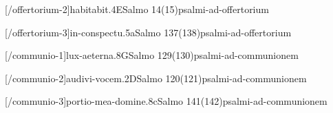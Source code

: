 \AllowPageFlush

[\Prefix/offertorium-2]{habitabit.4E}{Salmo 14(15)}{psalmi-ad-offertorium}

\AllowPageFlush

[\Prefix/offertorium-3]{in-conspectu.5a}{Salmo 137(138)}{psalmi-ad-offertorium}

\AllowPageBreak

[\Prefix/communio-1]{lux-aeterna.8G}{Salmo 129(130)}{psalmi-ad-communionem}

\AllowPageFlush

[\Prefix/communio-2]{audivi-vocem.2D}{Salmo 120(121)}{psalmi-ad-communionem}

\AllowPageFlush

[\Prefix/communio-3]{portio-mea-domine.8c}{Salmo 141(142)}{psalmi-ad-communionem}

\AllowPageFlush